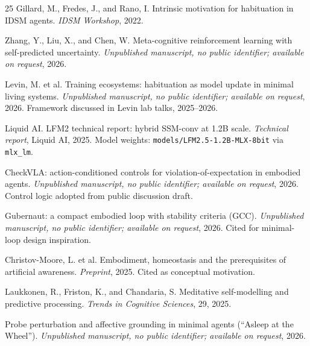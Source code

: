\documentclass[11pt,a4paper]{article}
\begin{document}
\begin{thebibliography}{25}
 Gillard, M., Fredes, J., and Rano, I. Intrinsic motivation for habituation in IDSM agents. \textit{IDSM Workshop}, 2022.

 Zhang, Y., Liu, X., and Chen, W. Meta-cognitive reinforcement learning with self-predicted uncertainty. \textit{Unpublished manuscript, no public identifier; available on request}, 2026.

 Levin, M. et al. Training ecosystems: habituation as model update in minimal living systems. \textit{Unpublished manuscript, no public identifier; available on request}, 2026. Framework discussed in Levin lab talks, 2025--2026.

 Liquid AI. LFM2 technical report: hybrid SSM-conv at 1.2B scale. \textit{Technical report}, Liquid AI, 2025. Model weights: \texttt{models/LFM2.5-1.2B-MLX-8bit} via \texttt{mlx\_lm}.

 CheckVLA: action-conditioned controls for violation-of-expectation in embodied agents. \textit{Unpublished manuscript, no public identifier; available on request}, 2026. Control logic adopted from public discussion draft.

 Gubernaut: a compact embodied loop with stability criteria (GCC). \textit{Unpublished manuscript, no public identifier; available on request}, 2026. Cited for minimal-loop design inspiration.

 Christov-Moore, L. et al. Embodiment, homeostasis and the prerequisites of artificial awareness. \textit{Preprint}, 2025. Cited as conceptual motivation.

 Laukkonen, R., Friston, K., and Chandaria, S. Meditative self-modelling and predictive processing. \textit{Trends in Cognitive Sciences}, 29, 2025.

 Probe perturbation and affective grounding in minimal agents (``Asleep at the Wheel''). \textit{Unpublished manuscript, no public identifier; available on request}, 2026.

\end{thebibliography}
\end{document}
